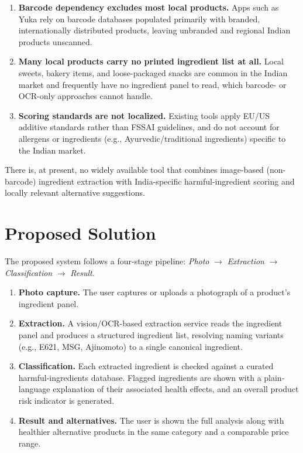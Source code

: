 \documentclass[11pt,a4paper]{article}
\begin{document}
\begin{enumerate}
  \item \textbf{Barcode dependency excludes most local products.} Apps such as Yuka rely on barcode databases populated primarily with branded, internationally distributed products, leaving unbranded and regional Indian products unscanned.
  \item \textbf{Many local products carry no printed ingredient list at all.} Local sweets, bakery items, and loose-packaged snacks are common in the Indian market and frequently have no ingredient panel to read, which barcode- or OCR-only approaches cannot handle.
  \item \textbf{Scoring standards are not localized.} Existing tools apply EU/US additive standards rather than FSSAI guidelines, and do not account for allergens or ingredients (e.g., Ayurvedic/traditional ingredients) specific to the Indian market.
\end{enumerate}

There is, at present, no widely available tool that combines image-based (non-barcode) ingredient extraction with India-specific harmful-ingredient scoring and locally relevant alternative suggestions.

\section{Proposed Solution}
The proposed system follows a four-stage pipeline: \newline\textit{Photo} $\rightarrow$ \textit{Extraction} $\rightarrow$ \textit{Classification} $\rightarrow$ \textit{Result}.

\begin{enumerate}
  \item \textbf{Photo capture.} The user captures or uploads a photograph of a product's ingredient panel.
  \item \textbf{Extraction.} A vision/OCR-based extraction service reads the ingredient panel and produces a structured ingredient list, resolving naming variants (e.g., E621, MSG, Ajinomoto) to a single canonical ingredient.
  \item \textbf{Classification.} Each extracted ingredient is checked against a curated harmful-ingredients database. Flagged ingredients are shown with a plain-language explanation of their associated health effects, and an overall product risk indicator is generated.
  \item \textbf{Result and alternatives.} The user is shown the full analysis along with healthier alternative products in the same category and a comparable price range.
\end{enumerate}
\end{document}
